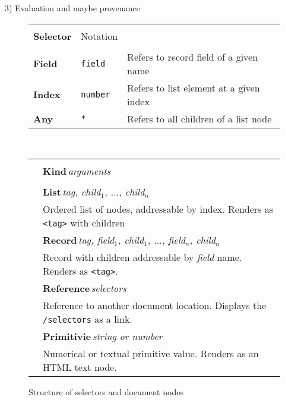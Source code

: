 \documentclass[sigconf]{acmart}
\begin{document}
3) Evaluation and maybe provenance

\newpage



\begin{figure}
\newcommand{\seltablecol}[3]{
\sffamily\small{\bfseries #2} & {\footnotesize #1} & \footnotesize #3\\
}
\newcommand{\ndtablecol}[4]{
\raisebox{-0.2em}{#1} & \sffamily\small{\bfseries #2}\,\;\textit{\footnotesize #3}\\[-0.2em]
&\sffamily\footnotesize #4\\[0.3em]
}

\begin{tabular}{|llp{18.08em}|}
\hline
\rowcolor{ekgray}
&&\\[-1em]
\rowcolor{ekgray}
\sffamily\small{\bfseries Selector} & {\sffamily\footnotesize Notation} & \\[0.2em]
\hline
&&\\[-1em]
\seltablecol{\Verb|field|}{Field}{Refers to record field of a given name}
\seltablecol{\Verb|number|}{Index}{Refers to list element at a given index}
\seltablecol{\Verb|*|}{Any}{Refers to all children of a list node}
\hline
\end{tabular}

~\\[0.5em]

\begin{tabular}{|cl|}
\hline
\rowcolor{ekgray}
&\\[-1em]
\rowcolor{ekgray}
& \sffamily\small{\bfseries Kind}\;\,\textit{\footnotesize arguments} \\[0.2em]
\hline
&\\[-1em]
\ndtablecol{\faListUl}{List}{tag, child$_1$, $\ldots$, child$_n$}
  {Ordered list of nodes, addressable by index. Renders as \Verb|<tag>| with children}
\ndtablecol{\faFileO}{Record}{tag, field$_1$, child$_1$, $\ldots$, field$_n$, child$_n$}
  {Record with children addressable by \textit{field} name. Renders as \Verb|<tag>|.}
\ndtablecol{\faExternalLink}{Reference}{selectors}
  {Reference to another document location. Displays the \Verb|/selectors| as a link.}
\ndtablecol{\faFont}{Primitivie}{string \textnormal{or} number}
  {Numerical or textual primitive value. Renders as an HTML text node.}
\hline
\end{tabular}
\vspace{-0.5em}
\caption{Structure of selectors and document nodes}
\label{fig:doc}
\vspace{-1em}
\end{figure}
\end{document}
